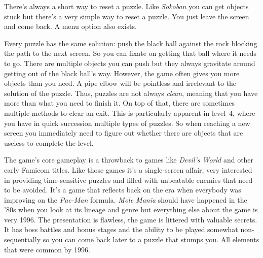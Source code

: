 \documentclass{book}
\begin{document}
There’s always a short way to reset a puzzle. Like \emph{Sokoban} you can get objects stuck but there’s a very simple way to reset a puzzle. You just leave the screen and come back. A menu option also exists.\par
Every puzzle has the same solution: push the black ball against the rock blocking the path to the next screen. So you can fixate on getting that ball where it needs to go. There are multiple objects you can push but they always gravitate around getting out of the black ball’s way. However, the game often gives you more objects than you need. A pipe elbow will be pointless and irrelevant to the solution of the puzzle. Thus, puzzles are not always \emph{clean}, meaning that you have more than what you need to finish it. On top of that, there are sometimes multiple methods to clear an exit. This is particularly apparent in level~4, where you have in quick succession multiple types of puzzles. So when reaching a new screen you immediately need to figure out whether there are objects that are useless to complete the level.\par
The game’s core gameplay is a throwback to games like \emph{Devil’s World} and other early Famicom titles. Like those games it’s a single-screen affair, very interested in providing time-sensitive puzzles and filled with unbeatable enemies that need to be avoided. It’s a game that reflects back on the era when everybody was improving on the \emph{Pac-Man} formula. \emph{Mole Mania} should have happened in the ’80s when you look at its lineage and genre but everything else about the game is very 1996. The presentation is flawless, the game is littered with valuable secrets. It has boss battles and bonus stages and the ability to be played somewhat non-sequentially so you can come back later to a puzzle that stumps you. All elements that were common by 1996.\par
\end{document}
